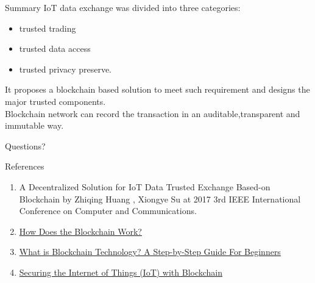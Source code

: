\documentclass[10pt]{beamer}
\begin{document}
\begin{frame}{Summary}
IoT data exchange was divided  into three categories: 
\begin{itemize}
\item trusted trading
\item trusted data access 
\item trusted privacy preserve.
\end{itemize}
\hspace{5mm}It proposes a blockchain based solution
to meet such requirement and designs the major trusted
components.\\
\hspace{5mm}Blockchain network can record the transaction in an auditable,transparent and immutable way.
  \begin{center}\ccbysa \end{center}
\end{frame}

\begin{frame}[standout]
  Questions?
\end{frame}

\appendix


\begin{frame}[allowframebreaks]{References}

	\begin{enumerate}
		\item A Decentralized Solution for IoT Data Trusted Exchange Based-on Blockchain by Zhiqing Huang , Xiongye Su at 2017 3rd IEEE International Conference on Computer and Communications.
		\item \href{https://medium.com/s/story/how-does-the-blockchain-work-98c8cd01d2ae}{How Does the Blockchain Work?}
		\item \href{https://blockgeeks.com/guides/what-is-blockchain-technology/}{What is Blockchain Technology? A Step-by-Step Guide For Beginners}
		\item \href{https://www.bbvaopenmind.com/en/securing-the-internet-of-things-iot-with-blockchain/}{Securing the Internet of Things (IoT) with Blockchain}
	\end{enumerate}

\end{frame}
\end{document}
